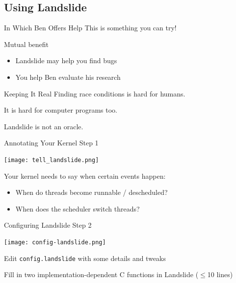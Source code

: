 \documentclass[xcolor=dvipsnames]{beamer}
\begin{document}
{%

\subsection{Using Landslide}


\begin{frame}{In Which Ben Offers Help}
	This is something you can try!
	\linegap

	Mutual benefit
	\begin{itemize}
		\item Landslide may help you find bugs
		\item You help Ben evaluate his research
	\end{itemize}
\end{frame}

\begin{frame}{Keeping It Real}
	Finding race conditions is hard for humans.

	\linegap
	It is hard for computer programs too.

	\linegap
	Landslide is not an oracle.
\end{frame}

\begin{frame}{Annotating Your Kernel}
	Step 1
	\begin{center}
		\texttt{[image: tell\_landslide.png]}
	\end{center}
	Your kernel needs to say when certain events happen:
	\begin{itemize}
		\item When do threads become runnable / descheduled?
		\item When does the scheduler switch threads?
	\end{itemize}
\end{frame}

\begin{frame}{Configuring Landslide}
	Step 2
	\begin{center}
		\texttt{[image: config-landslide.png]}
	\end{center}
	Edit \texttt{config.landslide} with some details and tweaks

	Fill in two implementation-dependent C functions in Landslide ($\le$10 lines)
\end{frame}

}
\end{document}
